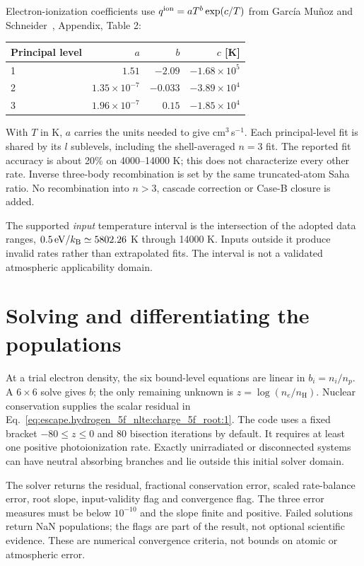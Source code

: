 \documentclass[11pt,a4paper]{article}
\newcommand{\nH}{n_{\mathrm H}}
\newcommand{\kb}{k_{\mathrm B}}
\begin{document}
Electron-ionization coefficients use $q^{\rm ion}=aT^b\exp(c/T)$ from
Garc\'ia Mu\~noz and Schneider~\cite{garcia}, Appendix, Table 2:
\begin{center}
\begin{tabular}{@{}lrrr@{}}
\toprule
Principal level & $a$ & $b$ & $c$ [K]\\
\midrule
1 & $1.51$ & $-2.09$ & $-1.68\times10^5$\\
2 & $1.35\times10^{-7}$ & $-0.033$ & $-3.89\times10^4$\\
3 & $1.96\times10^{-7}$ & $0.15$ & $-1.85\times10^4$\\
\bottomrule
\end{tabular}
\end{center}
With $T$ in K, $a$ carries the units needed to give cm$^3$\,s$^{-1}$.
Each principal-level fit is shared by its $l$ sublevels, including the
shell-averaged $n=3$ fit. The reported fit accuracy is about 20\% on
4000--14000 K; this does not characterize every other rate. Inverse
three-body recombination is set by the same truncated-atom Saha ratio.
No recombination into $n>3$, cascade correction or Case-B closure is added.

The supported \emph{input} temperature interval is the intersection of the
adopted data ranges, $0.5\,{\rm eV}/\kb\simeq5802.26$ K through 14000 K.
Inputs outside it produce invalid rates rather than extrapolated fits.
The interval is not a validated atmospheric applicability domain.

\section{Solving and differentiating the populations}
At a trial electron density, the six bound-level equations are linear in
$b_i=n_i/n_p$. A $6\times6$ solve gives $b$; the only remaining unknown is
$z=\log(n_e/\nH)$. Nuclear conservation supplies the scalar residual in
Eq.~\eqref{eq:escape.hydrogen_5f_nlte:charge_5f_root:1}.
The code uses a fixed bracket $-80\le z\le0$ and 80 bisection iterations by
default. It requires at least one positive photoionization rate. Exactly
unirradiated or disconnected systems can have neutral absorbing branches
and lie outside this initial solver domain.

The solver returns the residual, fractional conservation error, scaled
rate-balance error, root slope, input-validity flag and convergence flag.
The three error measures must be below $10^{-10}$ and the slope finite and
positive. Failed solutions return NaN populations; the flags are part of
the result, not optional scientific evidence. These are numerical convergence
criteria, not bounds on atomic or atmospheric error.
\end{document}
